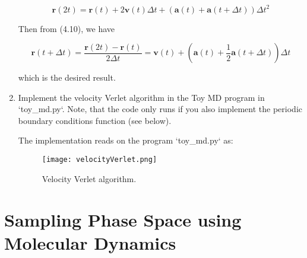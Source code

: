 \documentclass[12pt,letterpaper]{report}
\begin{document}
\begin{enumerate}
		$$
			\mathbf{r}(2t) = \mathbf{r}(t) + 2\mathbf{v}(t)\Delta t + \left( \mathbf{a}(t) + \mathbf{a}(t + \Delta t) \right) \Delta t^{2}
		$$
		
		Then from (4.10), we have
		
		$$
			\mathbf{r}(t + \Delta t) = \dfrac{ \mathbf{r}(2t) - \mathbf{r}(t) }{2 \Delta t}
			=
			\mathbf{v}(t) + \left( \mathbf{a}(t) + \dfrac{1}{2} \mathbf{a}(t + \Delta t) \right) \Delta t
		$$
		
		which is the desired result.
		
		\item
		Implement the velocity Verlet algorithm in the Toy MD program in `toy\_md.py`. Note, that the code only runs if you also implement the periodic boundary conditions function (see below).
		
		The implementation reads on the program `toy\_md.py` as: 
		
		\begin{figure}[H]
			\centering
			\texttt{[image: velocityVerlet.png]}		
			\caption{Velocity Verlet algorithm.}
			\label{fig::velocityVerlet}
		\end{figure} 
		
	\end{enumerate}

	
	\section*{Sampling Phase Space using Molecular Dynamics}	
	
\end{document}

